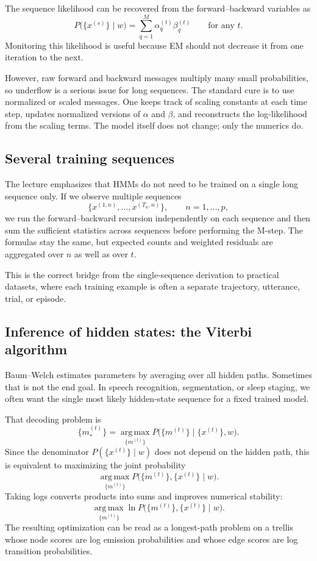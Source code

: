 The sequence likelihood can be recovered from the forward--backward variables as
\[
  P\bigl(\{x^{(s)}\}\mid w\bigr)
  =
  \sum_{q=1}^{M}\alpha_q^{(t)}\beta_q^{(t)}
  \qquad \text{for any } t.
\]
Monitoring this likelihood is useful because EM should not decrease it from one iteration to the next.

However, raw forward and backward messages multiply many small probabilities, so underflow is a serious issue for long sequences. The standard cure is to use normalized or scaled messages. One keeps track of scaling constants at each time step, updates normalized versions of $\alpha$ and $\beta$, and reconstructs the log-likelihood from the scaling terms. The model itself does not change; only the numerics do.

\subsection{Several training sequences}

The lecture emphasizes that HMMs do not need to be trained on a single long sequence only. If we observe multiple sequences
\[
  \bigl\{x^{(1,n)},\dots,x^{(T_n,n)}\bigr\},
  \qquad n=1,\dots,p,
\]
we run the forward--backward recursion independently on each sequence and then sum the sufficient statistics across sequences before performing the M-step. The formulas stay the same, but expected counts and weighted residuals are aggregated over $n$ as well as over $t$.

This is the correct bridge from the single-sequence derivation to practical datasets, where each training example is often a separate trajectory, utterance, trial, or episode.

\subsection{Inference of hidden states: the Viterbi algorithm}

Baum--Welch estimates parameters by averaging over all hidden paths. Sometimes that is not the end goal. In speech recognition, segmentation, or sleep staging, we often want the single most likely hidden-state sequence for a fixed trained model.

That decoding problem is
\[
  \{m_*^{(t)}\}
  =
  \operatorname*{arg\,max}_{\{m^{(t)}\}}
  P\bigl(\{m^{(t)}\}\mid \{x^{(t)}\},w\bigr).
\]
Since the denominator $P(\{x^{(t)}\}\mid w)$ does not depend on the hidden path, this is equivalent to maximizing the joint probability
\[
  \operatorname*{arg\,max}_{\{m^{(t)}\}}
  P\bigl(\{m^{(t)}\},\{x^{(t)}\}\mid w\bigr).
\]
Taking logs converts products into sums and improves numerical stability:
\[
  \operatorname*{arg\,max}_{\{m^{(t)}\}}
  \ln P\bigl(\{m^{(t)}\},\{x^{(t)}\}\mid w\bigr).
\]
The resulting optimization can be read as a longest-path problem on a trellis whose node scores are log emission probabilities and whose edge scores are log transition probabilities.

